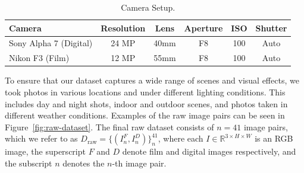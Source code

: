 \begin{table}
    \centering
    \caption{Camera Setup.}
    \begin{tabular}{lccccc}
        \toprule
        \textbf{Camera} & \textbf{Resolution} & \textbf{Lens} & \textbf{Aperture} & \textbf{ISO} & \textbf{Shutter} \\
        \midrule
        Sony Alpha 7 (Digital) & 24 MP & 40mm & F8 & 100 & Auto \\
        Nikon F3 (Film) & 12 MP & 55mm & F8 & 100 & Auto\\
        \bottomrule
    \end{tabular}
    \label{tab:cameras}
\end{table}

To ensure that our dataset captures a wide range of scenes and visual effects,
we took photos in various locations and under different lighting conditions.
This includes day and night shots, indoor and outdoor scenes, and photos taken
in different weather conditions. Examples of the raw image pairs can be seen in
Figure~\ref{fig:raw-dataset}. The final raw dataset consists of $n=41$ image
pairs, which we refer to as $D_{\text{raw}}=\{(I^F_n, I^D_n)\}_n^{41}$, where
each $I\in\mathbb{R}^{3 \times H \times W}$ is an RGB image, the superscript $F$
and $D$ denote film and digital images respectively, and the subscript $n$
denotes the $n$-th image pair.


